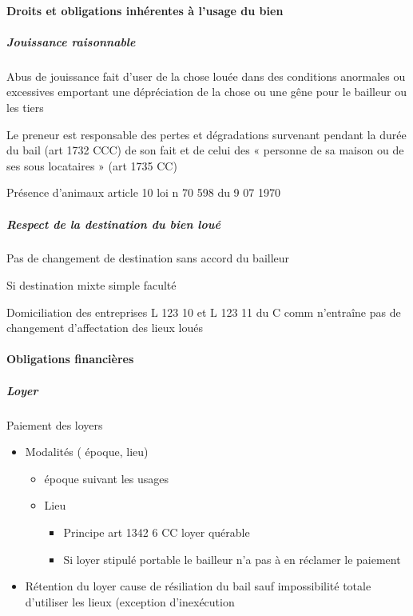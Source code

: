 \documentclass[10pt,a4paper,twoside]{article}
\begin{document}
		\paragraph{Droits et obligations inhérentes à l’usage du bien}

			\subparagraph{Jouissance raisonnable}

				Abus de jouissance fait d’user de la chose louée
				dans des conditions anormales ou excessives
				emportant une dépréciation de la chose ou une gêne
				pour le bailleur ou les tiers

				Le preneur est responsable des pertes et
				dégradations survenant pendant la durée du bail (art
				1732 CCC) de son fait et de celui des « personne de sa
				maison ou de ses sous locataires » (art 1735 CC)

				Présence d’animaux article 10 loi n 70 598 du
				9 07 1970

			\subparagraph{Respect de la destination du bien loué}

				Pas de changement de destination sans accord du bailleur

				Si destination mixte simple faculté

				Domiciliation des entreprises L 123 10 et L 123
				11 du C comm n’entraîne pas de changement
				d’affectation des lieux loués

		\paragraph{Obligations financières}

			\subparagraph{Loyer}
				Paiement des loyers

				\begin{itemize}
					\item Modalités ( époque, lieu)
						\begin{itemize}
							\item époque suivant les usages

							\item Lieu
								\begin{itemize}
									\item Principe art 1342 6 CC loyer quérable

									\item Si loyer stipulé portable le bailleur n’a pas à en réclamer le paiement
								\end{itemize}
						\end{itemize}

					\item Rétention du loyer cause de résiliation du bail sauf impossibilité totale
					d’utiliser les lieux (exception d’inexécution
				\end{itemize}
\end{document}

